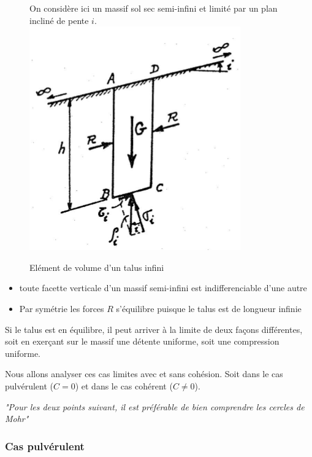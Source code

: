         \begin{figure}[h!]
            On considère ici un massif sol sec semi-infini et limité par un plan incliné de pente $i$.
            \center
            \includegraphics[scale=1]{Holeyman/images/H6.PNG}
            \caption{Elément de volume d'un talus infini}
        \end{figure}
            
        \begin{itemize}
            \item toute facette verticale d'un massif semi-infini est indifferenciable d'une autre
            \item Par symétrie les forces $R$ s'équilibre puisque le talus est de longueur infinie
        \end{itemize} 
        
        Si le talus est en équilibre, il peut arriver à la limite de deux façons différentes, soit en exerçant sur le massif une détente uniforme, soit une compression uniforme. 
        
        Nous allons analyser ces cas limites avec et sans cohésion. Soit dans le cas pulvérulent ($C = 0$) et dans le cas cohérent ($C \ne 0$).
        
        \begin{center}
               \textit{"Pour les deux points suivant, il est préférable de bien comprendre les cercles de Mohr"}
        \end{center}
        
        \subsubsection{Cas pulvérulent}
        
